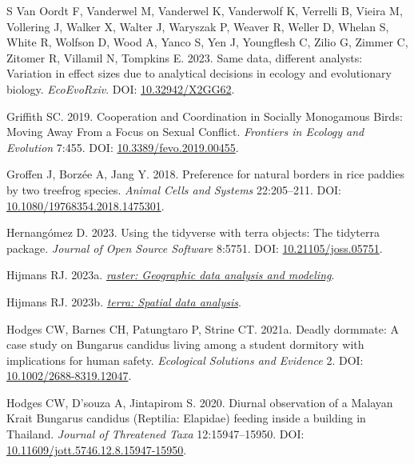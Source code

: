 \documentclass[10pt,a4paper]{article}
\newlength{\cslhangindent}
\newenvironment{CSLReferences}[2] %
 {\begin{list}{}{%
  \setlength{\itemindent}{0pt}
  \setlength{\leftmargin}{0pt}
  \setlength{\parsep}{0pt}
  \ifodd #1
   \setlength{\leftmargin}{\cslhangindent}
   \setlength{\itemindent}{-1\cslhangindent}
  \fi
  \setlength{\itemsep}{#2\baselineskip}}}
 {\end{list}}
\begin{document}
\begin{CSLReferences}{1}{0}
S, Van Oordt F, Vanderwel M, Vanderwel K, Vanderwolf K, Verrelli B, Vieira M, Vollering J, Walker X, Walter J, Waryszak P, Weaver R, Weller D, Whelan S, White R, Wolfson D, Wood A, Yanco S, Yen J, Youngflesh C, Zilio G, Zimmer C, Zitomer R, Villamil N, Tompkins E. 2023. Same data, different analysts: Variation in effect sizes due to analytical decisions in ecology and evolutionary biology. \emph{EcoEvoRxiv}. DOI: \href{https://doi.org/10.32942/X2GG62}{10.32942/X2GG62}.

Griffith SC. 2019. Cooperation and {Coordination} in {Socially} {Monogamous} {Birds}: {Moving} {Away} {From} a {Focus} on {Sexual} {Conflict}. \emph{Frontiers in Ecology and Evolution} 7:455. DOI: \href{https://doi.org/10.3389/fevo.2019.00455}{10.3389/fevo.2019.00455}.

Groffen J, Borzée A, Jang Y. 2018. Preference for natural borders in rice paddies by two treefrog species. \emph{Animal Cells and Systems} 22:205--211. DOI: \href{https://doi.org/10.1080/19768354.2018.1475301}{10.1080/19768354.2018.1475301}.

Hernangómez D. 2023. Using the {tidyverse} with {terra} objects: The {tidyterra} package. \emph{Journal of Open Source Software} 8:5751. DOI: \href{https://doi.org/10.21105/joss.05751}{10.21105/joss.05751}.

Hijmans RJ. 2023a. \emph{\href{https://CRAN.R-project.org/package=raster}{{raster}: Geographic data analysis and modeling}}.

Hijmans RJ. 2023b. \emph{\href{https://CRAN.R-project.org/package=terra}{{terra}: Spatial data analysis}}.

Hodges CW, Barnes CH, Patungtaro P, Strine CT. 2021a. Deadly dormmate: {A} case study on {Bungarus} {candidus} living among a student dormitory with implications for human safety. \emph{Ecological Solutions and Evidence} 2. DOI: \href{https://doi.org/10.1002/2688-8319.12047}{10.1002/2688-8319.12047}.

Hodges CW, D'souza A, Jintapirom S. 2020. Diurnal observation of a {Malayan} {Krait} {Bungarus} candidus ({Reptilia}: {Elapidae}) feeding inside a building in {Thailand}. \emph{Journal of Threatened Taxa} 12:15947--15950. DOI: \href{https://doi.org/10.11609/jott.5746.12.8.15947-15950}{10.11609/jott.5746.12.8.15947-15950}.


\end{CSLReferences}
\end{document}
